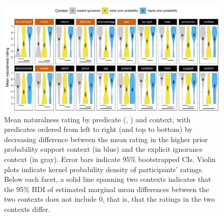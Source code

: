 \documentclass[11pt,fleqn]{article}
\newcommand{\6}{\mbox{$[\hspace*{-.6mm}[$}}
\newcommand{\9}{\mbox{$]\hspace*{-.6mm}]$}}
\begin{document}
\begin{figure}[h!]
\centering
\includegraphics[width=\textwidth]{../../../results/main/graphs/naturalness-by-context-and-predicate-with-stats}
\caption{Mean naturalness rating by predicate (, ) and context, with predicates ordered from left to right (and top to bottom) by decreasing difference between the mean rating in the higher prior probability support context (in blue) and the explicit ignorance context (in gray). Error bars indicate 95\% bootstrapped CIs. Violin plots indicate kernel probability density of participants' ratings. Below each facet, a solid line spanning two contexts indicates that the 95\% HDI of estimated marginal mean differences between the two contexts does not include 0, that is, that the ratings in the two contexts differ.}\label{fig:acc-by-context}
\end{figure}

\end{document}
